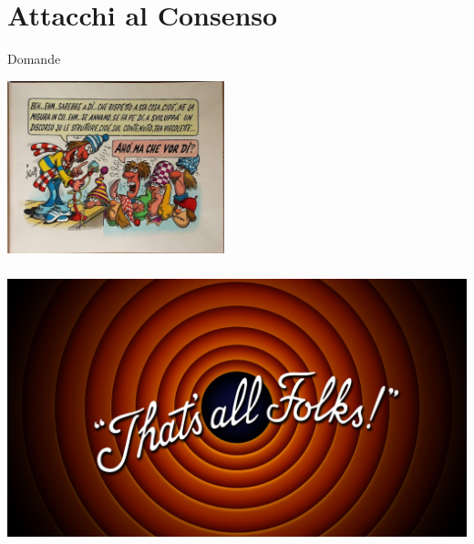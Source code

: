 \documentclass[aspectratio=169]{beamer}
\begin{document}
\section{Attacchi al Consenso}




\begin{frame}{Domande} 
    \begin{center}
        \includegraphics[height=5cm]{domande.jpg}
    \end{center}
\end{frame}

\begin{frame}[plain]
    \begin{center}
        \includegraphics[height=8cm]{fine.jpg}
    \end{center}
\end{frame}
\end{document}
